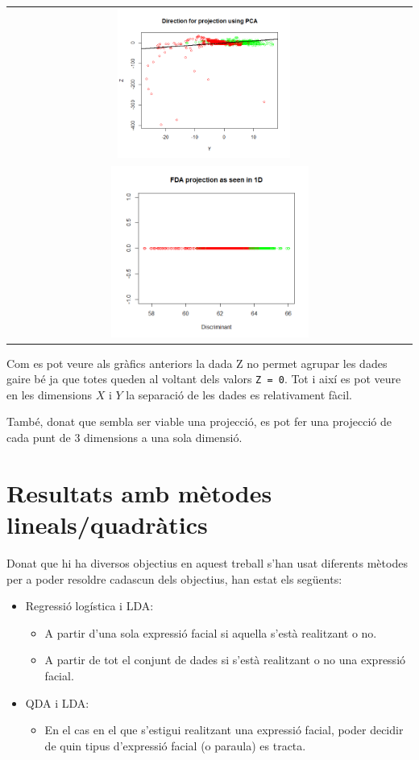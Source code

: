 \documentclass[a4paper]{article}
\begin{document}
\begin{longtable}{cc}
	\includegraphics[width=0.45\textwidth]{images/PCA_YZ} \\
	\multicolumn{2}{c}{\includegraphics[width=0.5\textwidth]{images/FDA_projection}}
\end{longtable}

Com es pot veure als gràfics anteriors la dada Z no permet agrupar les dades gaire bé ja que totes queden al voltant dels valors \verb|Z = 0|. Tot i així es pot veure en les dimensions $X$ i $Y$ la separació de les dades es relativament fàcil. 

També, donat que sembla ser viable una projecció, es pot fer una projecció de cada punt de 3 dimensions a una sola dimensió.

\section{Resultats amb mètodes lineals/quadràtics}
Donat que hi ha diversos objectius en aquest treball s'han usat diferents mètodes per a poder resoldre cadascun dels objectius, han estat els següents:
\begin{itemize}
	\item Regressió logística i LDA:
	\begin{itemize}
		\item A partir d'una sola expressió facial si aquella s'està realitzant o no.
		\item A partir de tot el conjunt de dades si s'està realitzant o no una expressió facial.
	\end{itemize}
	\item QDA i LDA:
	\begin{itemize}
		\item En el cas en el que s'estigui realitzant una expressió facial, poder decidir de quin tipus d'expressió facial (o paraula) es tracta.
	\end{itemize}
\end{itemize}
\end{document}
